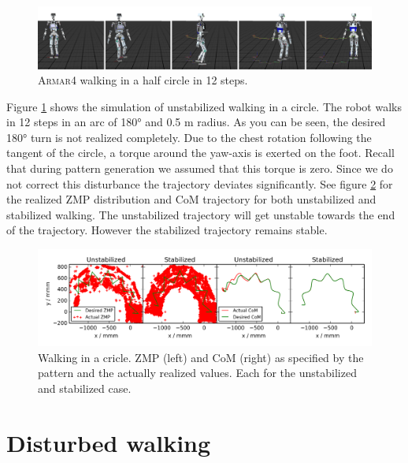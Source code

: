 \documentclass[english,ngerman]{KITreprt}
\newcommand{\name}[1]{\textsc{#1}}
\begin{document}
\begin{figure}[hbt]
\vspace*{-1em}
\includegraphics[width=\textwidth,resolution=300]{images/undisturbed_circle_thumbs.png}
\caption{\name{Armar4} walking in a half circle in 12 steps.}
\label{img:player-undisturbed-circle-thumbs}
\end{figure}

Figure \ref{img:player-undisturbed-circle-thumbs} shows the simulation
of unstabilized walking in a circle. The robot walks in 12 steps in an
arc of 180° and 0.5 m radius. As you can be seen, the desired 180° turn
is not realized completely. Due to the chest rotation following the
tangent of the circle, a torque around the yaw-axis is exerted on the
foot. Recall that during pattern generation we assumed that this torque
is zero. Since we do not correct this disturbance the trajectory
deviates significantly. See figure \ref{img:undisturbed-circle} for the
realized ZMP distribution and CoM trajectory for both unstabilized and
stabilized walking. The unstabilized trajectory will get unstable
towards the end of the trajectory. However the stabilized trajectory
remains stable.

\begin{figure}[hbt]
\vspace*{-1em}
\includegraphics[width=\textwidth,resolution=300]{images/undisturbed_circle.png}
\caption{Walking in a cricle. ZMP (left) and CoM (right) as specified by the pattern and the actually realized values.
Each for the unstabilized and stabilized case.}
\label{img:undisturbed-circle}
\end{figure}

\section{Disturbed walking}\label{disturbed-walking}
\end{document}
